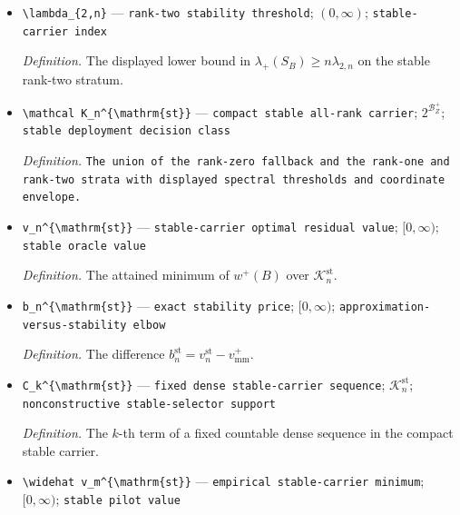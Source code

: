 \documentclass{article}
\begin{document}
\begin{itemize}
  \item \texttt{\textbackslash{}\allowbreak{}lambda\_\allowbreak{}\{2,\allowbreak{}n\}\allowbreak{}} --- \texttt{rank-\allowbreak{}two stability threshold}; \((0,\infty)\); \texttt{stable-\allowbreak{}carrier index}
  \par\smallskip\noindent\emph{Definition.} The displayed lower bound in \(\lambda_+(S_B)\ge n\lambda_{2,n}\) on the stable rank-two stratum.
  \item \texttt{\textbackslash{}\allowbreak{}mathcal K\_\allowbreak{}n\textasciicircum{}\{\textbackslash{}\allowbreak{}mathrm\{st\}\allowbreak{}\}\allowbreak{}} --- \texttt{compact stable all-\allowbreak{}rank carrier}; \(2^{\mathcal B_Z^+}\); \texttt{stable deployment decision class}
  \par\smallskip\noindent\emph{Definition.} \texttt{The union of the rank-\allowbreak{}zero fallback and the rank-\allowbreak{}one and rank-\allowbreak{}two strata with displayed spectral thresholds and coordinate envelope.}
  \item \texttt{v\_\allowbreak{}n\textasciicircum{}\{\textbackslash{}\allowbreak{}mathrm\{st\}\allowbreak{}\}\allowbreak{}} --- \texttt{stable-\allowbreak{}carrier optimal residual value}; \([0,\infty)\); \texttt{stable oracle value}
  \par\smallskip\noindent\emph{Definition.} The attained minimum of \(w^+(B)\) over \(\mathcal K_n^{\mathrm{st}}\).
  \item \texttt{b\_\allowbreak{}n\textasciicircum{}\{\textbackslash{}\allowbreak{}mathrm\{st\}\allowbreak{}\}\allowbreak{}} --- \texttt{exact stability price}; \([0,\infty)\); \texttt{approximation-\allowbreak{}versus-\allowbreak{}stability elbow}
  \par\smallskip\noindent\emph{Definition.} The difference \(b_n^{\mathrm{st}}=v_n^{\mathrm{st}}-v_{\mathrm{mm}}^+\).
  \item \texttt{C\_\allowbreak{}k\textasciicircum{}\{\textbackslash{}\allowbreak{}mathrm\{st\}\allowbreak{}\}\allowbreak{}} --- \texttt{fixed dense stable-\allowbreak{}carrier sequence}; \(\mathcal K_n^{\mathrm{st}}\); \texttt{nonconstructive stable-\allowbreak{}selector support}
  \par\smallskip\noindent\emph{Definition.} The \(k\)-th term of a fixed countable dense sequence in the compact stable carrier.
  \item \texttt{\textbackslash{}\allowbreak{}widehat v\_\allowbreak{}m\textasciicircum{}\{\textbackslash{}\allowbreak{}mathrm\{st\}\allowbreak{}\}\allowbreak{}} --- \texttt{empirical stable-\allowbreak{}carrier minimum}; \([0,\infty)\); \texttt{stable pilot value}

\end{itemize}
\end{document}
